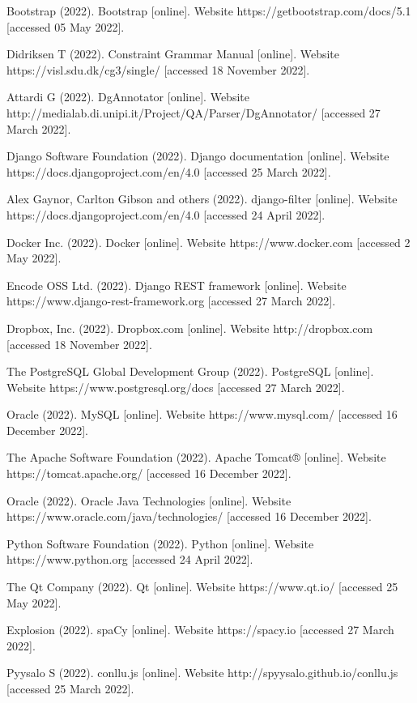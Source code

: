 \documentclass{elektr}
\begin{document}
\begin{thebibliography}{99}
 Bootstrap (2022). Bootstrap [online]. Website https://getbootstrap.com/docs/5.1 [accessed 05 May 2022].

 Didriksen T (2022). Constraint Grammar Manual [online]. Website https://visl.sdu.dk/cg3/single/ [accessed 18 November 2022].

 Attardi G (2022). {DgAnnotator} [online]. Website http://medialab.di.unipi.it/Project/QA/Parser/DgAnnotator/ [accessed 27 March 2022].

 Django Software Foundation (2022). Django documentation [online]. Website https://docs.djangoproject.com/en/4.0 [accessed 25 March 2022].

 Alex Gaynor, Carlton Gibson and others (2022). django-filter [online]. Website https://docs.djangoproject.com/en/4.0 [accessed 24 April 2022].

 Docker Inc. (2022). Docker [online]. Website https://www.docker.com [accessed 2 May 2022].

 Encode OSS Ltd. (2022). Django REST framework [online]. Website https://www.django-rest-framework.org [accessed 27 March 2022].

 Dropbox, Inc. (2022). Dropbox.com [online]. Website http://dropbox.com [accessed 18 November 2022].

 The PostgreSQL Global Development Group (2022). PostgreSQL [online]. Website https://www.postgresql.org/docs [accessed 27 March 2022].

 Oracle (2022). MySQL [online]. Website https://www.mysql.com/ [accessed 16 December 2022].

 The Apache Software Foundation (2022). Apache Tomcat® [online]. Website https://tomcat.apache.org/ [accessed 16 December 2022].

 Oracle (2022). Oracle Java Technologies [online]. Website https://www.oracle.com/java/technologies/ [accessed 16 December 2022].

 Python Software Foundation (2022). Python [online]. Website https://www.python.org [accessed 24 April 2022].

 The Qt Company (2022). Qt [online]. Website https://www.qt.io/ [accessed 25 May 2022].

 Explosion (2022). spaCy [online]. Website https://spacy.io [accessed 27 March 2022].

 Pyysalo S (2022). conllu.js [online]. Website http://spyysalo.github.io/conllu.js [accessed 25 March 2022].


\end{thebibliography}
\end{document}
